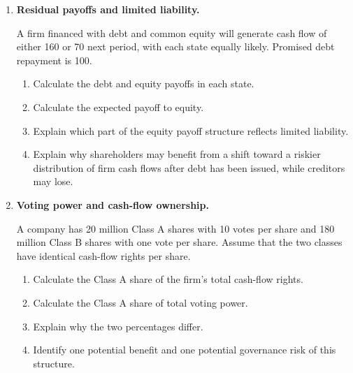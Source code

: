 

\begin{enumerate}

\item \textbf{Residual payoffs and limited liability.}

A firm financed with debt and common equity will generate cash flow of either 160 or 70 next period, with each state equally likely. Promised debt repayment is 100.

\begin{enumerate}

\item Calculate the debt and equity payoffs in each state.

\item Calculate the expected payoff to equity.

\item Explain which part of the equity payoff structure reflects limited liability.

\item Explain why shareholders may benefit from a shift toward a riskier distribution of firm cash flows after debt has been issued, while creditors may lose.

\end{enumerate}

\item \textbf{Voting power and cash-flow ownership.}

A company has 20 million Class A shares with 10 votes
per share and 180 million Class B shares with one vote
per share. Assume that the two classes have identical
cash-flow rights per share.

\begin{enumerate}

\item Calculate the Class A share of the firm's total
cash-flow rights.

\item Calculate the Class A share of total voting power.

\item Explain why the two percentages differ.

\item Identify one potential benefit and one potential
governance risk of this structure.


\end{enumerate}
\end{enumerate}
